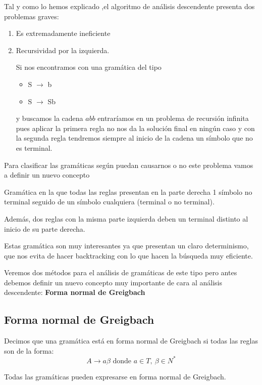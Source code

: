 \documentclass{apuntes}
\begin{document}
Tal y como lo hemos explicado ,el algoritmo de análisis descendente presenta dos problemas graves:
\begin{enumerate}
\item Es extremadamente ineficiente
\item Recursividad por la izquierda.

Si nos encontramos con una gramática del tipo
\begin{itemize}
\item S $\rightarrow$ b
\item S $\rightarrow$ Sb
\end{itemize}
y buscamos la cadena $abb$ entraríamos en un problema de recursión infinita pues aplicar la primera regla no nos da la solución final en ningún caso y con la segunda regla tendremos siempre al inicio de la cadena un símbolo que no es terminal.
\end{enumerate}

Para clasificar las gramáticas según puedan causarnos o no este problema vamos a definir un nuevo concepto

\begin{defn}[Gramática LL(1)]
Gramática en la que todas las reglas presentan en la parte derecha 1 símbolo no terminal seguido de un símbolo cualquiera (terminal o no terminal).

Además, dos reglas con la misma parte izquierda deben un terminal distinto al inicio de su parte derecha.
\end{defn}

Estas gramática son muy interesantes ya que presentan un claro determinismo, que nos evita de hacer backtracking con lo que hacen la búsqueda muy eficiente.


Veremos dos métodos para el análisis de gramáticas de este tipo pero antes debemos definir un nuevo concepto muy importante de cara al análisis descendente: \textbf{Forma normal de Greigbach}

\subsection{Forma normal de Greigbach}

\begin{defn}
Decimos que una gramática está en forma normal de Greigbach si todas las reglas son de la forma:
\[A \rightarrow a\beta \text{ donde } a \in T, \ \beta \in N^*\]
\end{defn}

\obs Todas las gramáticas pueden expresarse en forma normal de Greigbach.
\end{document}

